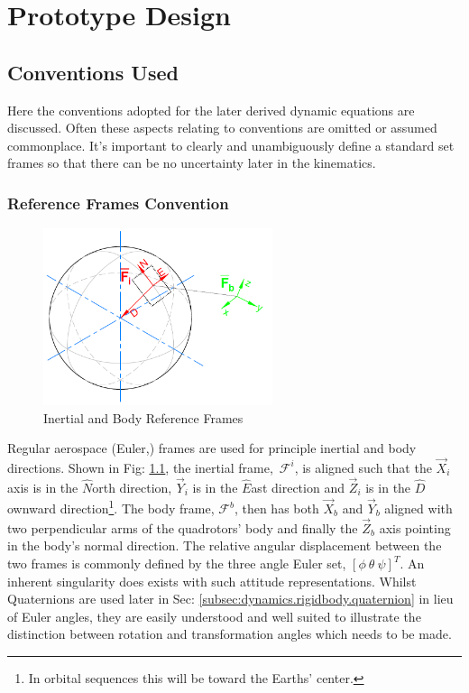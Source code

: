 \chapter{Prototype Design}
\label{ch:proto}
\section{Conventions Used}
\label{sec:proto.conventions}
Here the conventions adopted for the later derived dynamic equations are discussed. Often these aspects relating to conventions are omitted or assumed commonplace. It's important to clearly and unambiguously define a standard set frames so that there can be no uncertainty later in the kinematics.
\subsection{Reference Frames Convention}
\label{subsec:proto.conventions.frames}
\begin{figure}[htbp]
\centering
\includegraphics[width=0.6\textwidth]{figs/reference_frame}
\caption{Inertial and Body Reference Frames}
\label{fig:ref_frame}
\end{figure}
Regular aerospace (Euler,\cite{rigidbodylecture}) frames are used for principle inertial and body directions. Shown in Fig: \ref{fig:ref_frame}, the inertial frame,~$\mathcal{F}^i$, is aligned such that the $\vec{X}_i$ axis is in the $\hat{N}$orth direction, $\vec{Y}_i$ is in the $\hat{E}$ast direction and $\vec{Z}_i$ is  in the $\hat{D}$ownward direction\footnote{In orbital sequences this will be toward the Earths' center.}. The body frame, $\mathcal{F}^b$, then has both $\vec{X}_b$ and $\vec{Y}_b$ aligned with two perpendicular arms of the quadrotors' body and finally the $\vec{Z}_b$ axis pointing in the body's normal direction. The relative angular displacement between the two frames is commonly defined by the three angle Euler set, $[\phi ~\theta ~\psi]^T$. An inherent singularity does exists with such attitude representations. Whilst Quaternions are used later in Sec: \ref{subsec:dynamics.rigidbody.quaternion} in lieu of Euler angles, they are easily understood and well suited to illustrate the distinction between rotation and transformation angles which needs to be made.
\par

